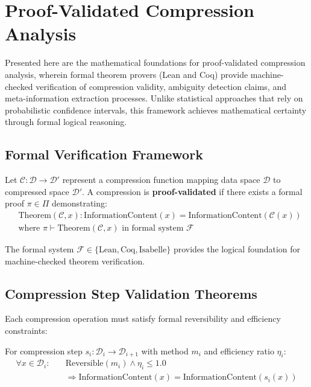 \section{Proof-Validated Compression Analysis}
\label{sec:proof-validation-compression}

Presented here are the mathematical foundations for proof-validated compression analysis, wherein formal theorem provers (Lean and Coq) provide machine-checked verification of compression validity, ambiguity detection claims, and meta-information extraction processes. Unlike statistical approaches that rely on probabilistic confidence intervals, this framework achieves mathematical certainty through formal logical reasoning.

\subsection{Formal Verification Framework}

\begin{definition}
Let $\mathcal{C}: \mathcal{D} \to \mathcal{D}'$ represent a compression function mapping data space $\mathcal{D}$ to compressed space $\mathcal{D}'$. A compression is \textbf{proof-validated} if there exists a formal proof $\pi \in \Pi$ demonstrating:
\begin{align}
&\text{Theorem}(\mathcal{C}, x): \text{InformationContent}(x) = \text{InformationContent}(\mathcal{C}(x)) \label{eq:info-preservation}\\
&\text{where } \pi \vdash \text{Theorem}(\mathcal{C}, x) \text{ in formal system } \mathcal{F}
\end{align}
\end{definition}

The formal system $\mathcal{F} \in \{\text{Lean}, \text{Coq}, \text{Isabelle}\}$ provides the logical foundation for machine-checked theorem verification.

\subsection{Compression Step Validation Theorems}

Each compression operation must satisfy formal reversibility and efficiency constraints:

\begin{theorem}
For compression step $s_i: \mathcal{D}_i \to \mathcal{D}_{i+1}$ with method $m_i$ and efficiency ratio $\eta_i$:
\begin{align}
\forall x \in \mathcal{D}_i: \quad &\text{Reversible}(m_i) \land \eta_i \leq 1.0 \label{eq:compression-validity}\\
&\Rightarrow \text{InformationContent}(x) = \text{InformationContent}(s_i(x))
\end{align}
\end{theorem}

